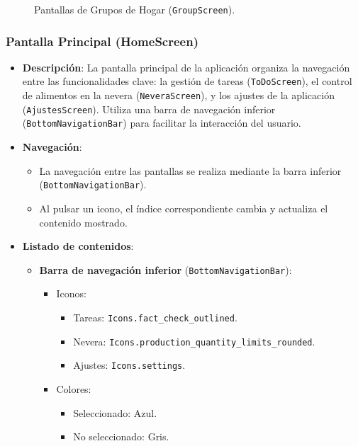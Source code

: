 \documentclass{article}
\begin{document}
\begin{flushleft}
\begin{figure}[H]
    \caption{Pantallas de Grupos de Hogar (\texttt{GroupScreen}).}
    \label{fig:group_screen}
\end{figure}


\clearpage

\subsubsection{Pantalla Principal (HomeScreen)}
\begin{itemize}
    \item \textbf{Descripción}: 
    La pantalla principal de la aplicación organiza la navegación entre las funcionalidades clave: la gestión de tareas (\texttt{ToDoScreen}), el control de alimentos en la nevera (\texttt{NeveraScreen}), y los ajustes de la aplicación (\texttt{AjustesScreen}). Utiliza una barra de navegación inferior (\texttt{BottomNavigationBar}) para facilitar la interacción del usuario.

  
    \item \textbf{Navegación}: 
    \begin{itemize}
        \item La navegación entre las pantallas se realiza mediante la barra inferior (\texttt{BottomNavigationBar}).
        \item Al pulsar un icono, el índice correspondiente cambia y actualiza el contenido mostrado.
    \end{itemize}

    \item \textbf{Listado de contenidos}: 
    \begin{itemize}
        \item \textbf{Barra de navegación inferior} (\texttt{BottomNavigationBar}):
        \begin{itemize}
            \item Iconos:
            \begin{itemize}
                \item Tareas: \texttt{Icons.fact\_check\_outlined}.
                \item Nevera: \texttt{Icons.production\_quantity\_limits\_rounded}.
                \item Ajustes: \texttt{Icons.settings}.
            \end{itemize}
            \item Colores:
            \begin{itemize}
                \item Seleccionado: Azul.
                \item No seleccionado: Gris.
            \end{itemize}
           

\end{itemize}
\end{itemize}
\end{itemize}
\end{flushleft}
\end{document}
